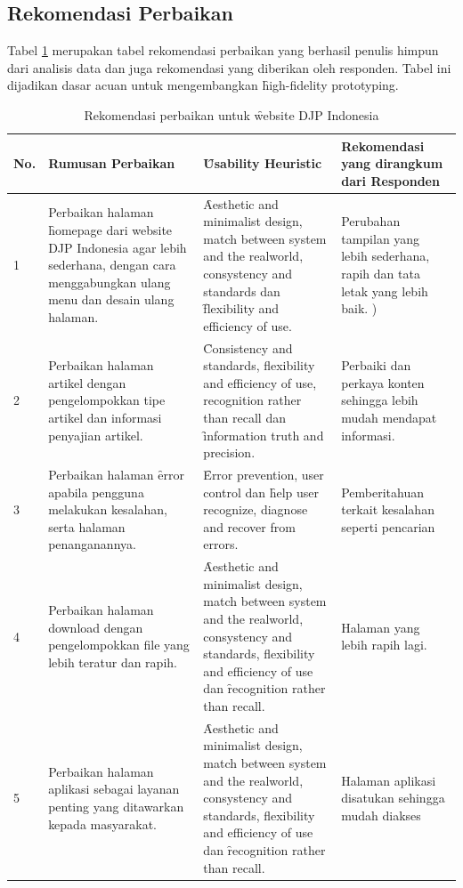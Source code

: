 \subsection{Rekomendasi Perbaikan}
Tabel \ref{tab:perbaikan} merupakan tabel rekomendasi perbaikan yang berhasil penulis himpun dari analisis data dan juga rekomendasi yang diberikan oleh responden. Tabel ini dijadikan dasar acuan untuk mengembangkan \f{high-fidelity prototyping}.
\begin{center}

\begin{longtable}{|p{0.5cm}|p{3.8cm}|p{3.8cm}|p{4.2cm}|}
	\caption{Rekomendasi perbaikan untuk \f{website} DJP Indonesia}
	\label{tab:perbaikan} \\
			\hline
			\textbf{No.} & \textbf{Rumusan Perbaikan} & \textbf{\f{Usability Heuristic}} & \textbf{Rekomendasi yang dirangkum dari Responden} \\ \hline \endhead
			1 & Perbaikan halaman \f{homepage} dari website DJP Indonesia agar lebih sederhana, dengan cara menggabungkan ulang menu dan desain ulang halaman. & \f{Aesthetic and minimalist design, match between system and the realworld, consystency and standards} dan \f{flexibility and efficiency of use.} & Perubahan tampilan yang lebih sederhana, rapih dan tata letak yang lebih baik. )\\ \hline
			2 & Perbaikan halaman artikel dengan pengelompokkan tipe artikel dan informasi penyajian artikel. & \f{Consistency and standards, flexibility and efficiency of use, recognition rather than recall} dan \f{information truth and precision.} & Perbaiki dan perkaya konten sehingga lebih mudah mendapat informasi. \\ \hline
			3 & Perbaikan halaman \f{error} apabila pengguna melakukan kesalahan, serta halaman penanganannya. & \f{Error prevention, user control} dan \f{help user recognize, diagnose and recover from errors.} & Pemberitahuan terkait kesalahan seperti pencarian  \\ \hline
			4 & Perbaikan halaman download dengan pengelompokkan file yang lebih teratur dan rapih. & \f{Aesthetic and minimalist design, match between system and the realworld, consystency and standards, flexibility and efficiency of use} dan \f{recognition rather than recall.} & Halaman yang lebih rapih lagi.  \\ \hline
			5 & Perbaikan halaman aplikasi sebagai layanan penting yang ditawarkan kepada masyarakat. & \f{Aesthetic and minimalist design, match between system and the realworld, consystency and standards, flexibility and efficiency of use} dan \f{recognition rather than recall.} & Halaman aplikasi disatukan sehingga mudah diakses  \\ \hline

\end{longtable}
\end{center}
